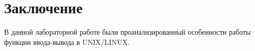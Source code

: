 \chapter{Заключение}

В данной лабораторной работе были проанализированный особенности работы функции ввода-вывода в UNIX/LINUX.
